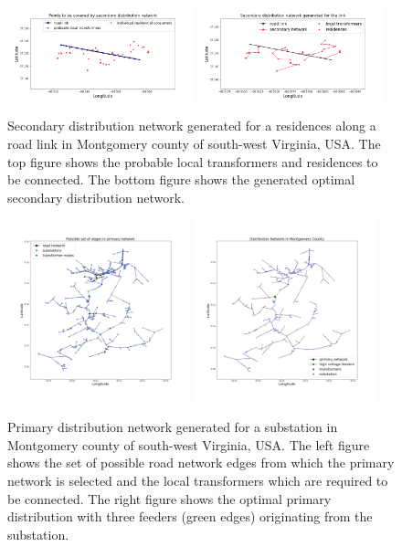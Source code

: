 \documentclass[sigconf]{acmart}
\begin{document}
\begin{figure}
	\centering
	\includegraphics[width=0.48\textwidth]{figs/secnet-base.png}
	\includegraphics[width=0.48\textwidth]{figs/secnet-result.png}
	\caption{Secondary distribution network generated for a residences along a road link in Montgomery county of south-west Virginia, USA. The top figure shows the probable local transformers and residences to be connected. The bottom figure shows the generated optimal secondary distribution network.}
	\label{fig:secondary}
\end{figure}
\begin{figure}[htb]
	\centering
	\includegraphics[width=0.47\textwidth]{figs/24664-master.png}
	\includegraphics[width=0.47\textwidth]{figs/24664-primarytest.png}
	\caption{Primary distribution network generated for a substation in Montgomery county of south-west Virginia, USA. The left figure shows the set of possible road network edges from which the primary network is selected and the local transformers which are required to be connected. The right figure shows the optimal primary distribution with three feeders (green edges) originating from the substation.}
	\label{fig:primary}
\end{figure}
\end{document}
